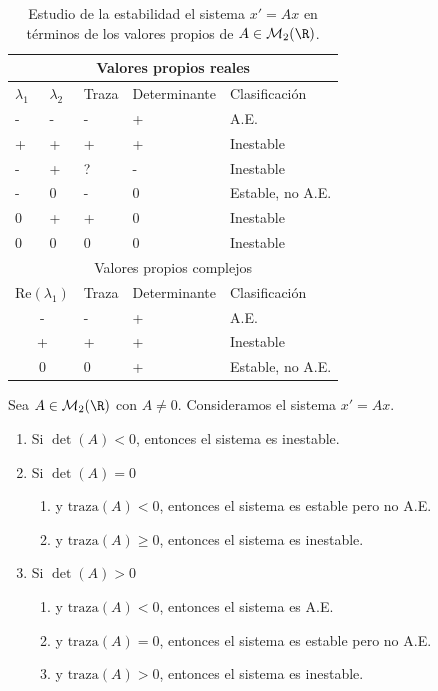 \begin{table}[H]
  \centering
  \begin{tabular}{|ll|ll|l|}
    \hline
    \multicolumn{5}{|c|}{Valores propios reales} \\
    \hline
    $\lambda_1$ & $\lambda_2$ & Traza & Determinante & Clasificación \\
    \hline
    - & - & - & + & A.E. \\
    + & + & + & + & Inestable \\
    - & + & ? & - & Inestable \\
    - & 0 & - & 0 & Estable, no A.E. \\
    0 & + & + & 0 & Inestable \\
    0 & 0 & 0 & 0 & Inestable \\
    \hline
    \multicolumn{5}{|c|}{Valores propios complejos} \\
    \hline
    \multicolumn{2}{|c}{$\mathrm{Re}(\lambda_1)$} & Traza & Determinante & Clasificación \\
    \hline
    \multicolumn{2}{|c}{-} & - & + & A.E. \\
    \multicolumn{2}{|c}{+} & + & + & Inestable \\
    \multicolumn{2}{|c}{0} & 0 & + & Estable, no A.E. \\
    \hline
  \end{tabular}
  \caption{Estudio de la estabilidad el sistema $x' = Ax$ en términos de los valores propios de
    $A \in \mathcal{M}_2(\R)$.}
  \label{table:estabiliad}
\end{table}


\begin{corollary}
  Sea $A \in \mathcal{M}_2(\R)$ con $A \ne 0$. Consideramos el sistema $x' = Ax$.
  
  \begin{enumerate}
  \item Si $\det(A) < 0$, entonces el sistema es inestable.
  \item Si $\det(A) = 0$
    \begin{enumerate}>
    \item y $\mathrm{traza}(A) < 0$, entonces el sistema es estable pero no A.E.
    \item y $\mathrm{traza}(A) \ge 0$, entonces el sistema es inestable.
    \end{enumerate}
  \item Si $\det(A) > 0$
    \begin{enumerate}
    \item y $\mathrm{traza}(A) < 0$, entonces el sistema es A.E.
    \item y $\mathrm{traza}(A) = 0$, entonces el sistema es estable pero no A.E.
    \item y $\mathrm{traza}(A) > 0$, entonces el sistema es inestable.
    \end{enumerate}
  \end{enumerate}
\end{corollary}


